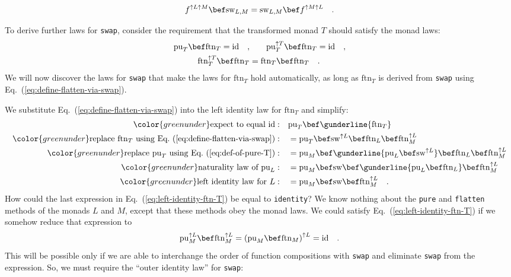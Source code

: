 ~\vspace{-0.35\baselineskip}
\begin{equation}
f^{\uparrow L\uparrow M}\bef\text{sw}_{L,M}=\text{sw}_{L,M}\bef f^{\uparrow M\uparrow L}\quad.\label{eq:swap-law-0-naturality}
\end{equation}

\noindent To derive further laws for \lstinline!swap!, consider the
requirement that the transformed monad $T$ should satisfy the monad
laws:
\begin{align*}
\text{pu}_{T}\bef\text{ftn}_{T}=\text{id}\quad, & \quad\quad\text{pu}_{T}^{\uparrow T}\bef\text{ftn}_{T}=\text{id}\quad,\\
\text{ftn}_{T}^{\uparrow T}\bef\text{ftn}_{T} & =\text{ftn}_{T}\bef\text{ftn}_{T}\quad.
\end{align*}
We will now discover the laws for \texttt{swap} that make the laws
for $\text{ftn}_{T}$ hold automatically, as long as $\text{ftn}_{T}$
is derived from \texttt{}\lstinline!swap! using Eq.~(\ref{eq:define-flatten-via-swap}).

We substitute Eq.~(\ref{eq:define-flatten-via-swap}) into the left
identity law for $\text{ftn}_{T}$ and simplify:
\begin{align}
{\color{greenunder}\text{expect to equal }\text{id}:}\quad & \text{pu}_{T}\bef\gunderline{\text{ftn}_{T}}\nonumber \\
{\color{greenunder}\text{replace }\text{ftn}_{T}\text{ using Eq.~(\ref{eq:define-flatten-via-swap})}:}\quad & =\text{pu}_{T}\bef\text{sw}^{\uparrow L}\bef\text{ftn}_{L}\bef\text{ftn}_{M}^{\uparrow L}\nonumber \\
{\color{greenunder}\text{replace }\text{pu}_{T}\text{ using Eq.~(\ref{eq:def-of-pure-T})}:}\quad & =\text{pu}_{M}\bef\gunderline{\text{pu}_{L}\bef\text{sw}^{\uparrow L}}\bef\text{ftn}_{L}\bef\text{ftn}_{M}^{\uparrow L}\nonumber \\
{\color{greenunder}\text{naturality law of }\text{pu}_{L}:}\quad & =\text{pu}_{M}\bef\text{sw}\bef\gunderline{\text{pu}_{L}\bef\text{ftn}_{L}}\bef\text{ftn}_{M}^{\uparrow L}\nonumber \\
{\color{greenunder}\text{left identity law for }L:}\quad & =\text{pu}_{M}\bef\text{sw}\bef\text{ftn}_{M}^{\uparrow L}\quad.\label{eq:left-identity-ftn-T}
\end{align}
How could the last expression in Eq.~(\ref{eq:left-identity-ftn-T})
be equal to \lstinline!identity!? We know nothing about the \texttt{}\lstinline!pure!
and \texttt{}\lstinline!flatten! methods of the monads $L$ and
$M$, except that these methods obey the monad laws. We could satisfy
Eq.~(\ref{eq:left-identity-ftn-T}) if we somehow reduce that expression
to
\[
\text{pu}_{M}^{\uparrow L}\bef\text{ftn}_{M}^{\uparrow L}=\left(\text{pu}_{M}\bef\text{ftn}_{M}\right)^{\uparrow L}=\text{id}\quad.
\]
This will be possible only if we are able to interchange the order
of function compositions with \lstinline!swap! and eliminate \lstinline!swap!
from the expression. So, we must require the \textsf{``}outer identity law\textsf{''}
for \lstinline!swap!:

